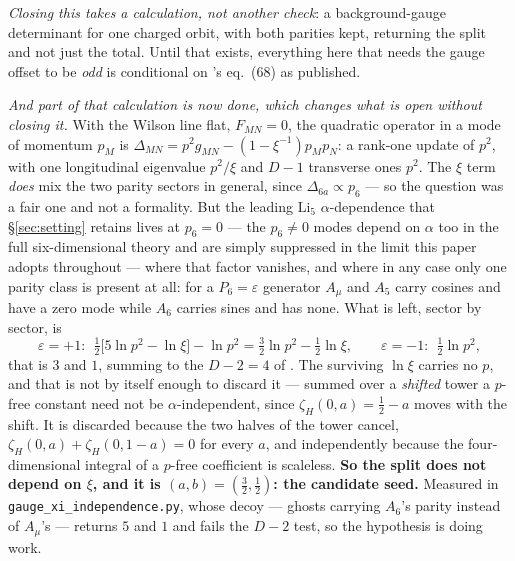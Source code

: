 \documentclass[11pt,a4paper]{article}
\begin{document}
\begin{itemize}
\emph{Closing this takes a calculation, not another check}: a background-gauge determinant for one
charged orbit, with both parities kept, returning the split and not just the total. Until that
exists, everything here that needs the gauge offset to be \emph{odd} is conditional on
\cite{KM25}'s eq.~(68) as published.

\emph{And part of that calculation is now done, which changes what is open without closing it.}
With the Wilson line flat, $F_{MN}=0$, the quadratic operator in a mode of momentum $p_M$ is
$\Delta_{MN}=p^2g_{MN}-(1-\xi^{-1})p_Mp_N$: a rank-one update of $p^2$, with one longitudinal
eigenvalue $p^2/\xi$ and $D-1$ transverse ones $p^2$. The $\xi$ term \emph{does} mix the two
parity sectors in general, since $\Delta_{6a}\propto p_6$ --- so the question was a fair one and
not a formality. But the leading $\mathrm{Li}_5$ $\alpha$-dependence that \S\ref{sec:setting}
retains lives at $p_6=0$ --- the $p_6\neq0$ modes depend on $\alpha$ too in the full
six-dimensional theory and are simply suppressed in the limit this paper adopts throughout ---
where that factor vanishes, and
where in any case only one parity class is present at all: for a $P_6=\varepsilon$ generator
$A_\mu$ and $A_5$ carry cosines and have a zero mode while $A_6$ carries sines and has none. What
is left, sector by sector, is
\begin{equation}\label{eq:xisplit}
  \varepsilon=+1:\ \ \tfrac12\bigl[5\ln p^2-\ln\xi\bigr]-\ln p^2=\tfrac32\ln p^2-\tfrac12\ln\xi,
  \qquad
  \varepsilon=-1:\ \ \tfrac12\ln p^2,
\end{equation}
that is $3$ and $1$, summing to the $D-2=4$ of \cite{HY04}. The surviving $\ln\xi$ carries no
$p$, and that is not by itself enough to discard it --- summed over a \emph{shifted} tower a
$p$-free constant need not be $\alpha$-independent, since $\zeta_H(0,a)=\tfrac12-a$ moves with the
shift. It is discarded because the two halves of the tower cancel, $\zeta_H(0,a)+\zeta_H(0,1-a)=0$
for every $a$, and independently because the four-dimensional integral of a $p$-free coefficient is
scaleless. \textbf{So the split does not depend on $\xi$, and it is $(a,b)=(\tfrac32,\tfrac12)$:
the candidate seed.} Measured in \texttt{gauge\_\allowbreak xi\_\allowbreak independence.py},
whose decoy --- ghosts carrying $A_6$'s parity instead of $A_\mu$'s --- returns $5$ and $1$ and
fails the $D-2$ test, so the hypothesis is doing work.


\end{itemize}
\end{document}
